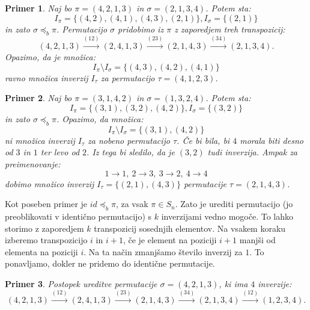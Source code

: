 \documentclass[a4paper, 12pt]{book}
\newtheorem{primer}{Primer}[chapter]
\begin{document}
\begin{primer}
    Naj bo $\pi = (4, 2, 1, 3)$ in $\sigma = (2, 1, 3, 4)$. Potem sta:
    \[I_{\pi} = \{ (4, 2), (4, 1), (4, 3), (2, 1) \}, I_{\sigma} = \{ (2, 1) \}\]
    in zato $\sigma \preceq_b \pi$. Permutacijo $\sigma$ pridobimo iz $\pi$ z zaporedjem treh transpozicij:
    \[
        (4, 2, 1, 3) \overset{(12)}{\rightarrow} (2, 4, 1, 3) \overset{(23)}{\rightarrow} (2, 1, 4, 3) \overset{(34)}{\rightarrow} (2, 1, 3, 4).
    \]
    Opazimo, da je množica:
    \[
        I_{\pi} \setminus I_{\sigma} = \{ (4, 3), (4, 2), (4, 1) \}
    \]
    ravno množica inverzij $I_{\tau}$ za permutacijo $\tau = (4, 1, 2, 3)$.
\end{primer}
    

\begin{primer}
\label{primer_preimenovanje_elementov_mnozice_inverzij}
    Naj bo $\pi = (3, 1, 4, 2)$ in $\sigma = (1, 3, 2, 4)$. Potem sta:
    \[I_{\pi} = \{ (3, 1), (3, 2), (4, 2) \}, I_{\sigma} = \{ (3, 2) \}\]
    in zato $\sigma \preceq_b \pi$. Opazimo, da množica:
    \[
        I_{\pi} \setminus I_{\sigma} = \{ (3, 1), (4, 2) \}
    \]
    ni množica inverzij $I_{\tau}$ za nobeno permutacijo $\tau$. Če bi bila, bi $4$ morala biti desno od $3$ in $1$ ter levo od $2$. Iz tega bi sledilo, da je $(3, 2)$ tudi inverzija. Ampak za preimenovanje:
    \[
        1 \rightarrow 1, \ 2 \rightarrow 3, \ 3 \rightarrow 2, \ 4 \rightarrow 4 
    \]
    dobimo množico inverzij $I_{\tau} = \{ (2, 1), (4, 3)\}$ permutacije $\tau = (2, 1, 4, 3)$.
\end{primer}

Kot poseben primer je $id \preceq_b \pi$, za vsak $\pi \in S_n$. Zato je urediti permutacijo (jo preoblikovati v identično permutacijo) s $k$ inverzijami vedno mogoče. To lahko storimo z zaporedjem $k$ transpozicij sosednjih elementov. Na vsakem koraku izberemo transpozicijo $i$ in $i+1$, če je element na poziciji $i+1$ manjši od elementa na poziciji $i$. Na ta način zmanjšamo število inverzij za $1$. To ponavljamo, dokler ne pridemo do identične permutacije.

\begin{primer}
    Postopek ureditve permutacije $\sigma = (4, 2, 1, 3)$, ki ima $4$ inverzije: 
    \[
        (4, 2, 1, 3) \overset{(12)}{\rightarrow} (2, 4, 1, 3) \overset{(23)}{\rightarrow} (2, 1, 4, 3) \overset{(34)}{\rightarrow} (2, 1, 3, 4) \overset{(12)}{\rightarrow} (1, 2, 3, 4).
    \]
\end{primer}
\end{document}
